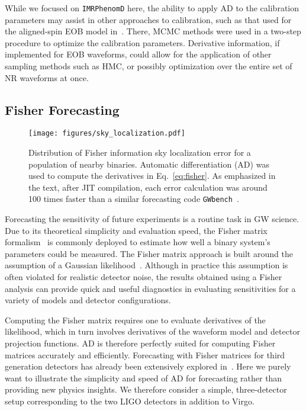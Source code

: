 \documentclass[twocolumn]{aastex631}
\begin{document}
While we focused on \texttt{IMRPhenomD} here, the ability to apply AD to the calibration parameters may assist in other approaches to calibration, such as that used for the aligned-spin EOB model in~\citet{Bohe:2016gbl}.
There, MCMC methods were used in a two-step procedure to optimize the calibration parameters. 
Derivative information, if implemented for EOB waveforms, could allow for the application of other sampling methods such as HMC, or possibly optimization over the entire set of NR waveforms at once.

\subsection{Fisher Forecasting}
\label{subsec:fisher}

\begin{figure}[t!]
    \centering
    \texttt{[image: figures/sky\_localization.pdf]}
    \caption{
        Distribution of Fisher information sky localization error for a population of nearby binaries.
        Automatic differentiation (AD) was used to compute the derivatives in Eq.~\eqref{eq:fisher}.
        As emphasized in the text, after JIT compilation, each error calculation was around 100 times faster than a similar forecasting code \texttt{GWbench}~\citep{Borhanian:2020ypi}.
    }
    \label{fig:sky_localization}
\end{figure}

Forecasting the sensitivity of future experiments is a routine task in GW science. 
Due to its theoretical simplicity and evaluation speed, the Fisher matrix formalism~\citep{Cornish:2010kf} is commonly deployed to estimate how well a binary system's parameters could be measured.
The Fisher matrix approach is built around the assumption of a Gaussian likelihood~\citep{Vallisneri:2007ev}.
Although in practice this assumption is often violated for realistic detector noise, the results obtained using a Fisher analysis can provide quick and useful diagnostics in evaluating sensitivities for a variety of models and detector configurations.

Computing the Fisher matrix requires one to evaluate derivatives of the likelihood, which in turn involves derivatives of the waveform model and detector projection functions.
AD is therefore perfectly suited for computing Fisher matrices accurately and efficiently. 
Forecasting with Fisher matrices for third generation detectors has already been extensively explored in~\citep{Iacovelli:2022bbs, Iacovelli:2022mbg}.
Here we purely want to illustrate the simplicity and speed of AD for forecasting rather than providing new physics insights.
We therefore consider a simple, three-detector setup corresponding to the two LIGO detectors in addition to Virgo.
\end{document}
